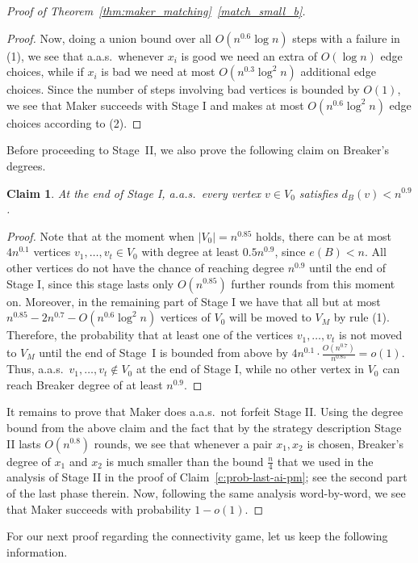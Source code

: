 \documentclass[11pt, a4paper]{article}
\numberwithin{equation}{section}
\numberwithin{figure}{section}
\newtheorem{claim}[theorem]{Claim}
\begin{document}
\begin{proof}[Proof of Theorem~\ref{thm:maker_matching}~\ref{match_small_b}]
\begin{proof}
Now, doing a union bound over all $O(n^{0.6}\log n )$ steps with a failure in (1), we see that a.a.s.~whenever $x_i$ is good we need an extra of $O(\log n)$ edge choices, while if $x_i$ is bad we need at most $O(n^{0.3}\log^2 n)$ additional edge choices. Since the number of
steps involving bad vertices is bounded by $O(1)$, we see that
Maker succeeds with Stage I and makes at most $O(n^{0.6}\log^2 n)$
edge choices according to (2).
\end{proof}

Before proceeding to Stage~II, we also prove the following claim on Breaker's degrees.

\begin{claim}
At the end of Stage I, a.a.s.~every vertex $v\in V_0$ satisfies
$d_B(v)<n^{0.9}$.
\end{claim}

\begin{proof}
Note that at the moment when $|V_0|=n^{0.85}$ holds,
there can be at most $4n^{0.1}$ vertices $v_1,\ldots,v_t\in V_0$
with degree at least $0.5n^{0.9}$, since $e(B)<n$.
All other vertices do not have the chance of reaching
degree $n^{0.9}$ until the end of Stage I,
since this stage lasts only $O(n^{0.85})$ further rounds from this moment on.
Moreover, in the remaining part of Stage I we have that
all but at most
$n^{0.85}-2n^{0.7}-O(n^{0.6}\log^2 n)$ vertices of $V_0$ will be moved
to $V_M$ by rule (1). Therefore, the probability that at least one of the vertices $v_1,\ldots,v_t$ is not moved to $V_M$ until the end of Stage~I is bounded from above by
$4n^{0.1} \cdot \frac{O(n^{0.7})}{n^{0.85}} = o(1)$.
Thus, a.a.s.~$v_1,\ldots,v_t\notin V_0$ at the end of Stage I, while no other vertex in $V_0$ can reach Breaker degree of at least $n^{0.9}$.
\end{proof}

It remains to prove that Maker does a.a.s.~not forfeit Stage II. Using the degree bound from the above claim and the fact that by the strategy description Stage II lasts $O(n^{0.8})$ rounds, we see that whenever a pair $x_1,x_2$ is chosen, Breaker's degree of $x_1$ and $x_2$ is much smaller than the bound $\frac{n}{4}$ that we used in the analysis of Stage II in the proof of Claim~\ref{c:prob-last-ai-pm}; see the second part of the last phase therein. Now, following the same analysis word-by-word,
we see that Maker succeeds with probability $1-o(1)$.
\end{proof}

For our next proof regarding the connectivity game,
let us keep the following information.
\end{document}
